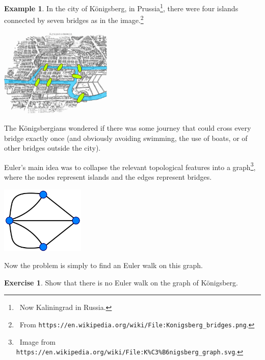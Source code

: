 \documentclass[a4paper, 10pt]{amsart}
\theoremstyle{definition}
\newtheorem{ex}[thm]{Example}
\newtheorem{exercise}[thm]{Exercise}
\theoremstyle{remark}
\begin{document}
\begin{ex}
  In the city of K\"onigsberg, in Prussia\footnote{~Now Kaliningrad in Russia.}, there were four islands connected by seven bridges as
  in the image.\footnote{~From \texttt{https://en.wikipedia.org/wiki/File:Konigsberg\_bridges.png}.}
  \begin{center}
    \includegraphics[width=0.4\textwidth]{konig1}
  \end{center}
  The K\"onigsbergians wondered if there was some journey that could cross every bridge exactly once (and obviously avoiding swimming, the use of boats, or of
  other bridges outside the city).

  Euler's main idea was to collapse the relevant topological features into a graph\footnote{~Image from \texttt{https://en.wikipedia.org/wiki/File:K\%C3\%B6nigsberg\_graph.svg}.}, where the nodes represent islands and the edges represent bridges.
  \begin{center}
    \includegraphics[width=0.3\textwidth]{konig2}
  \end{center}
  Now the problem is simply to find an Euler walk on this graph.
\end{ex}

\begin{exercise}
  Show that there is no Euler walk on the graph of K\"onigsberg.
\end{exercise}
\end{document}
